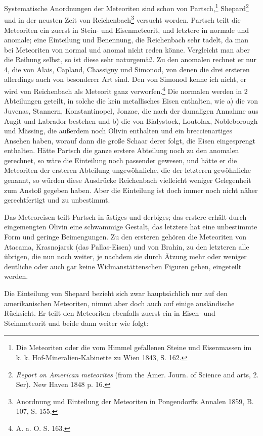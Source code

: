 \documentclass[a4paper, 11pt, oneside]{article}
\begin{document}
Systematische Anordnungen der Meteoriten sind schon von Partsch,\footnote{Die Meteoriten oder die vom Himmel gefallenen Steine und Eisenmassen im k. k. Hof-Mineralien-Kabinette zu Wien 1843, S. 162.} Shepard\footnote{\emph{Report on American meteorites} (from the Amer. Journ. of Science and arts, 2. Ser). New Haven 1848 p. 16.} und in der neusten Zeit von Reichenbach\footnote{Anordnung und Einteilung der Meteoriten in Pongendorffs Annalen 1859, B. 107, S. 155.} versucht worden. Partsch teilt die Meteoriten ein zuerst in Stein- und Eisenmeteorit, und letztere in normale und anomale; eine Einteilung und Benennung, die Reichenbach sehr tadelt, da man bei Meteoriten von normal und anomal nicht reden könne. Vergleicht man aber die Reihung selbst, so ist diese sehr naturgemäß. Zu den anomalen rechnet er nur 4, die von Alais, Capland, Chassigny und Simonod, von denen die drei ersteren allerdings auch von besonderer Art sind. Den von Simonod kenne ich nicht, er wird von Reichenbach als Meteorit ganz verworfen.\footnote{A. a. O. S. 163.} Die normalen werden in 2 Abteilungen geteilt, in solche die kein metallisches Eisen enthalten, wie a) die von Juvenas, Stannern, Konstantinopel, Jonzac, die nach der damaligen Annahme aus Augit und Labrador bestehen und b) die von Bialystock, Loutolax, Nobleborough und Mässing, die außerdem noch Olivin enthalten und ein breccienartiges Ansehen haben, worauf dann die große Schaar derer folgt, die Eisen eingesprengt enthalten. Hätte Partsch die ganze erstere Abteilung noch zu den anomalen gerechnet, so wäre die Einteilung noch passender gewesen, und hätte er die Meteoriten der ersteren Abteilung ungewöhnliche, die der letzteren gewöhnliche genannt, so würden diese Ausdrücke Reichenbach vielleicht weniger Gelegenheit zum Anstoß gegeben haben. Aber die Einteilung ist doch immer noch nicht näher gerechtfertigt und zu unbestimmt.

Das Meteoreisen teilt Partsch in ästiges und derbiges; das erstere erhält durch eingemengten Olivin eine schwammige Gestalt, das letztere hat eine unbestimmte Form und geringe Beimengungen. Zu den ersteren gehören die Meteoriten von Atacama, Krasnojarsk (das Pallas-Eisen) und von Brahin, zu den letzteren alle übrigen, die nun noch weiter, je nachdem sie durch Ätzung mehr oder weniger deutliche oder auch gar keine Widmanstättenschen Figuren geben, eingeteilt werden.

Die Einteilung von Shepard bezieht sich zwar hauptsächlich nur auf den amerikanischen Meteoriten, nimmt aber doch auch auf einige ausländische Rücksicht. Er teilt den Meteoriten ebenfalls zuerst ein in Eisen- und Steinmeteorit und beide dann weiter wie folgt:
\end{document}
